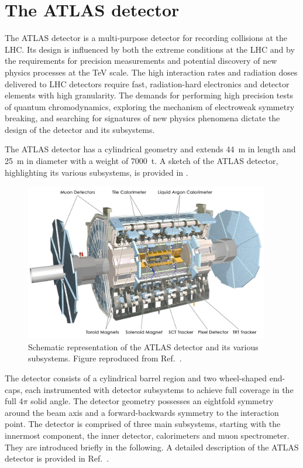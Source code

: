 \section{The ATLAS detector}
\label{sec:experiment:ATLAS}
The ATLAS detector is a multi-purpose detector for recording collisions at the LHC. Its design is influenced by both the extreme conditions at the LHC and by the requirements for precision measurements and potential discovery of new physics processes at the \si{\tera\electronvolt} scale.
The high interaction rates and radiation doses delivered to LHC detectors require fast, radiation-hard electronics and detector elements with high granularity. The demands for performing high precision tests of quantum chromodynamics,  exploring the mechanism of electroweak symmetry breaking, and searching for signatures of new physics phenomena dictate the design of the detector and its subsystems.

The ATLAS detector has a cylindrical geometry and extends \SI{44}{\meter} in length and \SI{25}{\meter} in diameter with a weight of \SI{7000}{\tonne}. A sketch of the ATLAS detector, highlighting its various subsystems, is provided in .

\begin{figure}[htbp]
    \centering
    \includegraphics[width=0.95\textwidth]{figures/experiment/detector_full.jpg}
    \caption{Schematic representation of the ATLAS detector and its various subsystems. Figure reproduced from Ref.~\cite{ATLAS2008}.}
    \label{fig:ATLAS-full}
\end{figure}

The detector consists of a cylindrical barrel region and two wheel-shaped end-caps, each instrumented with detector subsystems to achieve full coverage in the full \(4\pi\) solid angle. The detector geometry possesses an eightfold symmetry around the beam axis and a forward-backwards symmetry to the interaction point.
The detector is comprised of three main subsystems, starting with the innermost component, the inner detector, calorimeters and muon spectrometer. They are introduced briefly in the following. A detailed description of the ATLAS detector is provided in Ref.~\cite{ATLAS2008}.
